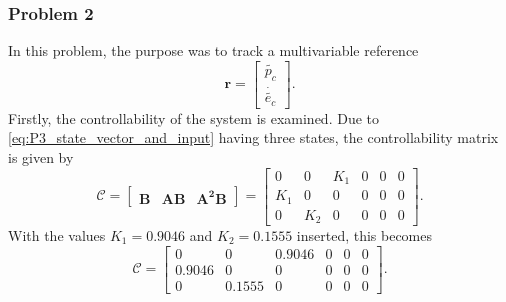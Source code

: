 \subsubsection{Problem 2}
In this problem, the purpose was to track a multivariable reference
\begin{equation}\label{eq:P3_p2_reference}
    \mathbf{r}=
        \begin{bmatrix}
            \tilde{p_c}\\
            \dot{\tilde{e_c}}
        \end{bmatrix}.
\end{equation}
Firstly, the controllability of the system is examined. Due to \cref{eq:P3_state_vector_and_input} having three states, the controllability matrix is given by
\begin{equation}\label{eq:P3_p2_controllability_matrix}
    \mathcal{C}=
        \begin{bmatrix}
            \mathbf{B}&\mathbf{AB}&\mathbf{A^2B}
        \end{bmatrix}
        =
        \begin{bmatrix}
            0   &   0   &  K_1 &0&0&0 \\
            K_1 &   0   &  0   &0&0&0 \\
            0   &   K_2 &  0   &0&0&0
        \end{bmatrix}.
\end{equation}
With the values $K_1=0.9046$ and $K_2=0.1555$ inserted, this becomes 
\begin{equation}
    \mathcal{C}=
        \begin{bmatrix}
            0      &   0      &  0.9046 &0&0&0 \\
            0.9046 &   0      &  0      &0&0&0 \\
            0      &   0.1555 &  0      &0&0&0
        \end{bmatrix}.
\end{equation}
